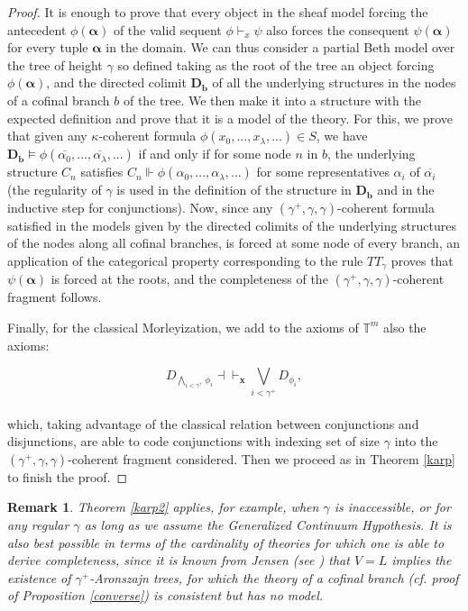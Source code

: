 \documentclass[a4paper,11pt]{article}
\theoremstyle{plain}
\newtheorem{rmk}[thm]{Remark}
\theoremstyle{plain}
\theoremstyle{remark}
\newcommand{\alg}[1]{\ensuremath{\mathbf{#1}}}
\newcommand{\theory}{\ensuremath{\mathbb{T}}}
\begin{document}
\begin{proof}
It is enough to prove that every object in the sheaf model forcing the antecedent $\phi(\boldsymbol{\alpha})$ of the valid sequent $\phi \vdash_x \psi$ also forces the consequent $\psi(\boldsymbol{\alpha})$ for every tuple $\boldsymbol{\alpha}$ in the domain. We can thus consider a partial Beth model over the tree of height $\gamma$ so defined taking as the root of the tree an object forcing $\phi(\boldsymbol{\alpha})$, and the directed colimit $\mathbf{D_b}$ of all the underlying structures in the nodes of a cofinal branch $b$ of the tree. We then make it into a structure with the expected definition and prove that it is a model of the theory. For this, we prove that given any $\kappa$-coherent formula $\phi(x_0, ..., x_{\lambda}, ...) \in S$, we have $\mathbf{D_b} \vDash \phi(\overline{\alpha_0}, ..., \overline{\alpha_{\lambda}}, ...)$ if and only if for some node $n$ in $b$, the underlying structure $C_n$ satisfies $C_n \Vdash \phi(\alpha_0, ..., \alpha_{\lambda}, ...)$ for some representatives $\alpha_i$ of $\overline{\alpha_i}$ (the regularity of $\gamma$ is used in the definition of the structure in $\mathbf{D_b}$ and in the inductive step for conjunctions). Now, since any $(\gamma^+, \gamma, \gamma)$-coherent formula satisfied in the models given by the directed colimits of the underlying structures of the nodes along all cofinal branches, is forced at some node of every branch, an application of the categorical property corresponding to the rule $TT_{\gamma}$ proves that $\psi(\boldsymbol{\alpha})$ is forced at the roots, and the completeness of the $(\gamma^+, \gamma, \gamma)$-coherent fragment follows. 

Finally, for the classical Morleyization, we add to the axioms of $\theory^m$ also the axioms:

$$D_{\bigwedge_{i<{\gamma^+}}\phi_i}\dashv\vdash_{\alg{x}}\bigvee_{i<{\gamma^+}}D_{\phi_i},$$
\\
which, taking advantage of the classical relation between conjunctions and disjunctions, are able to code conjunctions with indexing set of size $\gamma$ into the $(\gamma^+, \gamma, \gamma)$-coherent fragment considered. Then we proceed as in Theorem \ref{karp} to finish the proof.
\end{proof}

\begin{rmk} 
 Theorem \ref{karp2} applies, for example, when $\gamma$ is inaccessible, or for any regular $\gamma$ as long as we assume the Generalized Continuum Hypothesis. It is also best possible in terms of the cardinality of theories for which one is able to derive completeness, since it is known from Jensen (see \cite{jensen}) that $V=L$ implies the existence of $\gamma^+$-Aronszajn trees, for which the theory of a cofinal branch (\emph{cf.} proof of Proposition \ref{converse}) is consistent but has no model.
\end{rmk}
\end{document}
